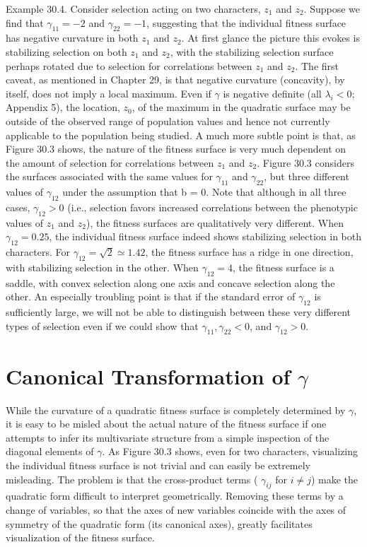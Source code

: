\documentclass{article}
\begin{document}
Example 30.4. Consider selection acting on two characters,  $ z_1 $ and  $ z_2 $. Suppose we find that  $ \gamma_{11} = -2 $ and  $ \gamma_{22} = -1 $, suggesting that the individual fitness surface has negative curvature in both  $ z_1 $ and  $ z_2 $. At first glance the picture this evokes is stabilizing selection on both  $ z_1 $ and  $ z_2 $, with the stabilizing selection surface perhaps rotated due to selection for correlations between  $ z_1 $ and  $ z_2 $. The first caveat, as mentioned in Chapter 29, is that negative curvature (concavity), by itself, does not imply a local maximum. Even if  $ \gamma $ is negative definite (all  $ \lambda_i < 0 $; Appendix 5), the location,  $ z_0 $, of the maximum in the quadratic surface may be outside of the observed range of population values and hence not currently applicable to the population being studied. A much more subtle point is that, as Figure 30.3 shows, the nature of the fitness surface is very much dependent on the amount of selection for correlations between  $ z_1 $ and  $ z_2 $. Figure 30.3 considers the surfaces associated with the same values for  $ \gamma_{11} $ and  $ \gamma_{22} $, but three different values of  $ \gamma_{12} $ under the assumption that b = 0. Note that although in all three cases,  $ \gamma_{12} > 0 $ (i.e., selection favors increased correlations between the phenotypic values of  $ z_1 $ and  $ z_2 $), the fitness surfaces are qualitatively very different. When  $ \gamma_{12} = 0.25 $, the individual fitness surface indeed shows stabilizing selection in both characters. For  $ \gamma_{12} = \sqrt{2} \simeq 1.42 $, the fitness surface has a ridge in one direction, with stabilizing selection in the other. When  $ \gamma_{12} = 4 $, the fitness surface is a saddle, with convex selection along one axis and concave selection along the other. An especially troubling point is that if the standard error of  $ \gamma_{12} $ is sufficiently large, we will not be able to distinguish between these very different types of selection even if we could show that  $ \gamma_{11}, \gamma_{22} < 0 $, and  $ \gamma_{12} > 0 $.

\section{Canonical Transformation of  $ \gamma $}
While the curvature of a quadratic fitness surface is completely determined by  $ \gamma $, it is easy to be misled about the actual nature of the fitness surface if one attempts to infer its multivariate structure from a simple inspection of the diagonal elements of  $ \gamma $. As Figure 30.3 shows, even for two characters, visualizing the individual fitness surface is not trivial and can easily be extremely misleading. The problem is that the cross-product terms ( $ \gamma_{ij} $ for  $ i \neq j $) make the quadratic form difficult to interpret geometrically. Removing these terms by a change of variables, so that the axes of new variables coincide with the axes of symmetry of the quadratic form (its canonical axes), greatly facilitates visualization of the fitness surface.
\end{document}
